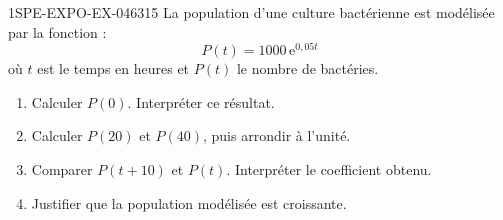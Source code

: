 \begin{exercice}{1SPE-EXPO-EX-046}{3}{15}
La population d'une culture bactérienne est modélisée par la fonction :
\[P(t) = 1000\,\mathrm{e}^{0{,}05t}\]
où $t$ est le temps en heures et $P(t)$ le nombre de bactéries.
\begin{enumerate}
\item Calculer $P(0)$. Interpréter ce résultat.
\item Calculer $P(20)$ et $P(40)$, puis arrondir à l'unité.
\item Comparer $P(t+10)$ et $P(t)$. Interpréter le coefficient obtenu.
\item Justifier que la population modélisée est croissante.
\end{enumerate}
\end{exercice}
